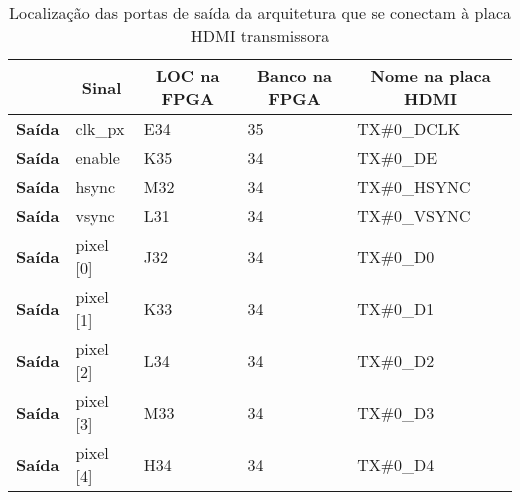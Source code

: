 \begin{longtable}{@{}rllll@{}}
			\caption{Localização das portas de saída da arquitetura que se conectam à placa HDMI transmissora}
			\label{table:locPlanAdetail}
			\hline
			\centering
			\textbf{}                           & \multicolumn{1}{c}{\textbf{Sinal}} & \multicolumn{1}{c}{\textbf{LOC na FPGA}} & \multicolumn{1}{c}{\textbf{Banco na FPGA}} & \multicolumn{1}{c}{\textbf{Nome na placa HDMI}} \\  \hline \endhead
			\multicolumn{1}{r|}{\textbf{Saída}} & clk\_px                            & E34                                      & 35                                         & TX\#0\_DCLK                                     \\
			\multicolumn{1}{r|}{\textbf{Saída}} & enable                             & K35                                      & 34                                         & TX\#0\_DE                                       \\
			\multicolumn{1}{r|}{\textbf{Saída}} & hsync                              & M32                                      & 34                                         & TX\#0\_HSYNC                                    \\
			\multicolumn{1}{r|}{\textbf{Saída}} & vsync                              & L31                                      & 34                                         & TX\#0\_VSYNC                                    \\
			\multicolumn{1}{r|}{\textbf{Saída}} & pixel {[}0{]}                      & J32                                      & 34                                         & TX\#0\_D0                                       \\
			\multicolumn{1}{r|}{\textbf{Saída}} & pixel {[}1{]}                      & K33                                      & 34                                         & TX\#0\_D1                                       \\
			\multicolumn{1}{r|}{\textbf{Saída}} & pixel {[}2{]}                      & L34                                      & 34                                         & TX\#0\_D2                                       \\
			\multicolumn{1}{r|}{\textbf{Saída}} & pixel {[}3{]}                      & M33                                      & 34                                         & TX\#0\_D3                                       \\
			\multicolumn{1}{r|}{\textbf{Saída}} & pixel {[}4{]}                      & H34                                      & 34                                         & TX\#0\_D4                                       \\

\end{longtable}
